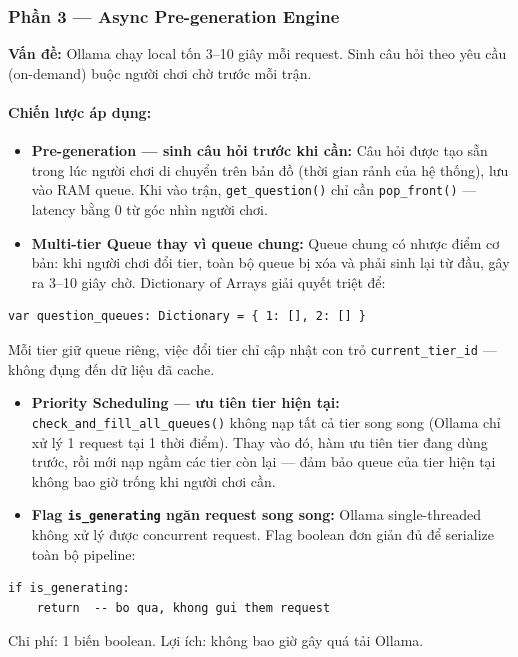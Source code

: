 \subsubsection{Phần 3 — Async Pre-generation Engine}
\textbf{Vấn đề:} Ollama chạy local tốn 3–10 giây mỗi request. Sinh câu hỏi theo yêu cầu (on-demand) buộc người chơi chờ trước mỗi trận.

\paragraph{Chiến lược áp dụng:}
\begin{itemize}
    \item \textbf{Pre-generation — sinh câu hỏi trước khi cần:} Câu hỏi được tạo sẵn trong lúc người chơi di chuyển trên bản đồ (thời gian rảnh của hệ thống), lưu vào RAM queue. Khi vào trận, \texttt{get\_question()} chỉ cần \texttt{pop\_front()} — latency bằng 0 từ góc nhìn người chơi.
    \item \textbf{Multi-tier Queue thay vì queue chung:} Queue chung có nhược điểm cơ bản: khi người chơi đổi tier, toàn bộ queue bị xóa và phải sinh lại từ đầu, gây ra 3–10 giây chờ. Dictionary of Arrays giải quyết triệt để:
\end{itemize}
\begin{lstlisting}
var question_queues: Dictionary = { 1: [], 2: [] }
\end{lstlisting}
Mỗi tier giữ queue riêng, việc đổi tier chỉ cập nhật con trỏ \texttt{current\_tier\_id} — không đụng đến dữ liệu đã cache.

\begin{itemize}
    \item \textbf{Priority Scheduling — ưu tiên tier hiện tại:} \texttt{check\_and\_fill\_all\_queues()} không nạp tất cả tier song song (Ollama chỉ xử lý 1 request tại 1 thời điểm). Thay vào đó, hàm ưu tiên tier đang dùng trước, rồi mới nạp ngầm các tier còn lại — đảm bảo queue của tier hiện tại không bao giờ trống khi người chơi cần.
    \item \textbf{Flag \texttt{is\_generating} ngăn request song song:} Ollama single-threaded không xử lý được concurrent request. Flag boolean đơn giản đủ để serialize toàn bộ pipeline:
\end{itemize}
\begin{lstlisting}
if is_generating:
    return  -- bo qua, khong gui them request
\end{lstlisting}
Chi phí: 1 biến boolean. Lợi ích: không bao giờ gây quá tải Ollama.

